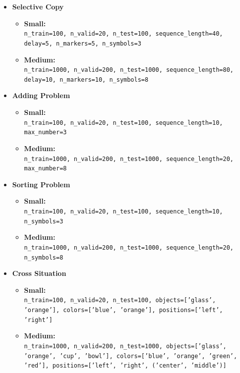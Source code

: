 \documentclass{article}
\begin{document}
\begin{itemize}
    \item \textbf{Selective Copy}
    \begin{itemize}
        \item \textbf{Small:}\\ \texttt{n\_train=100, n\_valid=20, n\_test=100, sequence\_length=40, delay=5, n\_markers=5, n\_symbols=3}
        \item \textbf{Medium:}\\ \texttt{n\_train=1000, n\_valid=200, n\_test=1000, sequence\_length=80, delay=10, n\_markers=10, n\_symbols=8}
    \end{itemize}

    \item \textbf{Adding Problem}
    \begin{itemize}
        \item \textbf{Small:}\\ \texttt{n\_train=100, n\_valid=20, n\_test=100, sequence\_length=10, max\_number=3}
        \item \textbf{Medium:}\\ \texttt{n\_train=1000, n\_valid=200, n\_test=1000, sequence\_length=20, max\_number=8}
    \end{itemize}

    \item \textbf{Sorting Problem}
    \begin{itemize}
        \item \textbf{Small:}\\ \texttt{n\_train=100, n\_valid=20, n\_test=100, sequence\_length=10, n\_symbols=3}
        \item \textbf{Medium:}\\ \texttt{n\_train=1000, n\_valid=200, n\_test=1000, sequence\_length=20, n\_symbols=8}
    \end{itemize}

    \item \textbf{Cross Situation}
    \begin{itemize}
        \item \textbf{Small:}\\ \texttt{n\_train=100, n\_valid=20, n\_test=100, objects=['glass', 'orange'], colors=['blue', 'orange'], positions=['left', 'right']}
        \item \textbf{Medium:}\\ \texttt{n\_train=1000, n\_valid=200, n\_test=1000, objects=['glass', 'orange', 'cup', 'bowl'], colors=['blue', 'orange', 'green', 'red'], positions=['left', 'right', ('center', 'middle')]}
    \end{itemize}


\end{itemize}
\end{document}
